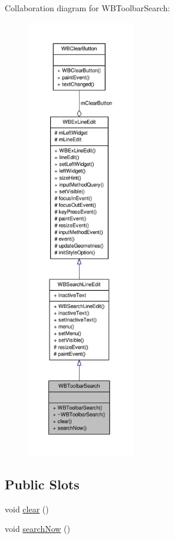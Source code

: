 Collaboration diagram for W\-B\-Toolbar\-Search\-:
\nopagebreak
\begin{figure}[H]
\begin{center}
\leavevmode
\includegraphics[height=550pt]{de/d99/class_w_b_toolbar_search__coll__graph}
\end{center}
\end{figure}
\subsection*{Public Slots}
\begin{DoxyCompactItemize}
\item 
void \hyperlink{class_w_b_toolbar_search_ab7ebe2c0430bc2b31f37942bcbb11de5}{clear} ()
\item 
void \hyperlink{class_w_b_toolbar_search_a24eb7599264750fc0fe2c6d5d5a2b6d3}{search\-Now} ()
\end{DoxyCompactItemize}
